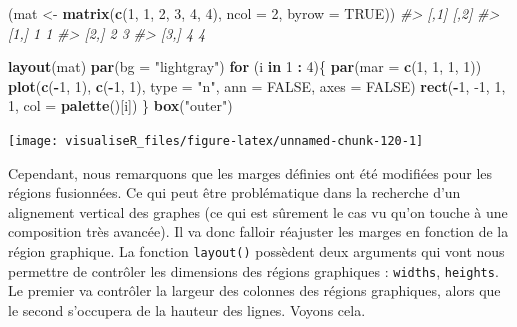 \documentclass[]{article}
\newenvironment{Shaded}{\begin{snugshade}}{\end{snugshade}}
\newcommand{\CommentTok}[1]{\textcolor[rgb]{0.56,0.35,0.01}{\textit{#1}}}
\newcommand{\ControlFlowTok}[1]{\textcolor[rgb]{0.13,0.29,0.53}{\textbf{#1}}}
\newcommand{\DataTypeTok}[1]{\textcolor[rgb]{0.13,0.29,0.53}{#1}}
\newcommand{\DecValTok}[1]{\textcolor[rgb]{0.00,0.00,0.81}{#1}}
\newcommand{\KeywordTok}[1]{\textcolor[rgb]{0.13,0.29,0.53}{\textbf{#1}}}
\newcommand{\NormalTok}[1]{#1}
\newcommand{\OperatorTok}[1]{\textcolor[rgb]{0.81,0.36,0.00}{\textbf{#1}}}
\newcommand{\OtherTok}[1]{\textcolor[rgb]{0.56,0.35,0.01}{#1}}
\newcommand{\StringTok}[1]{\textcolor[rgb]{0.31,0.60,0.02}{#1}}
\begin{document}
\begin{Shaded}
\begin{Highlighting}[]
\NormalTok{(mat <-}\StringTok{ }\KeywordTok{matrix}\NormalTok{(}\KeywordTok{c}\NormalTok{(}\DecValTok{1}\NormalTok{, }\DecValTok{1}\NormalTok{, }\DecValTok{2}\NormalTok{, }\DecValTok{3}\NormalTok{, }\DecValTok{4}\NormalTok{, }\DecValTok{4}\NormalTok{), }\DataTypeTok{ncol =} \DecValTok{2}\NormalTok{, }\DataTypeTok{byrow =} \OtherTok{TRUE}\NormalTok{))}
\CommentTok{#>      [,1] [,2]}
\CommentTok{#> [1,]    1    1}
\CommentTok{#> [2,]    2    3}
\CommentTok{#> [3,]    4    4}
\end{Highlighting}
\end{Shaded}

\begin{Shaded}
\begin{Highlighting}[]
\KeywordTok{layout}\NormalTok{(mat)}
\KeywordTok{par}\NormalTok{(}\DataTypeTok{bg =} \StringTok{"lightgray"}\NormalTok{)}
\ControlFlowTok{for}\NormalTok{ (i }\ControlFlowTok{in} \DecValTok{1} \OperatorTok{:}\StringTok{ }\DecValTok{4}\NormalTok{)\{}
\KeywordTok{par}\NormalTok{(}\DataTypeTok{mar =} \KeywordTok{c}\NormalTok{(}\DecValTok{1}\NormalTok{, }\DecValTok{1}\NormalTok{, }\DecValTok{1}\NormalTok{, }\DecValTok{1}\NormalTok{))}
\KeywordTok{plot}\NormalTok{(}\KeywordTok{c}\NormalTok{(}\OperatorTok{-}\DecValTok{1}\NormalTok{, }\DecValTok{1}\NormalTok{), }\KeywordTok{c}\NormalTok{(}\OperatorTok{-}\DecValTok{1}\NormalTok{, }\DecValTok{1}\NormalTok{), }\DataTypeTok{type =} \StringTok{"n"}\NormalTok{, }\DataTypeTok{ann =} \OtherTok{FALSE}\NormalTok{, }\DataTypeTok{axes =} \OtherTok{FALSE}\NormalTok{)}
\KeywordTok{rect}\NormalTok{(}\OperatorTok{-}\DecValTok{1}\NormalTok{, }\DecValTok{-1}\NormalTok{, }\DecValTok{1}\NormalTok{, }\DecValTok{1}\NormalTok{, }\DataTypeTok{col =} \KeywordTok{palette}\NormalTok{()[i])}
\NormalTok{\}}
\KeywordTok{box}\NormalTok{(}\StringTok{"outer"}\NormalTok{)}
\end{Highlighting}
\end{Shaded}

\begin{center}\texttt{[image: visualiseR\_files/figure-latex/unnamed-chunk-120-1]} \end{center}

Cependant, nous remarquons que les marges définies ont été modifiées pour les
régions fusionnées. Ce qui peut être problématique dans la recherche d'un
alignement vertical des graphes (ce qui est sûrement le cas vu qu'on touche à
une composition très avancée). Il va donc falloir réajuster les marges en
fonction de la région graphique. La fonction \texttt{layout()} possèdent deux arguments
qui vont nous permettre de contrôler les dimensions des régions graphiques :
\texttt{widths}, \texttt{heights}. Le premier va contrôler la largeur des colonnes des régions
graphiques, alors que le second s'occupera de la hauteur des lignes. Voyons
cela.
\end{document}
